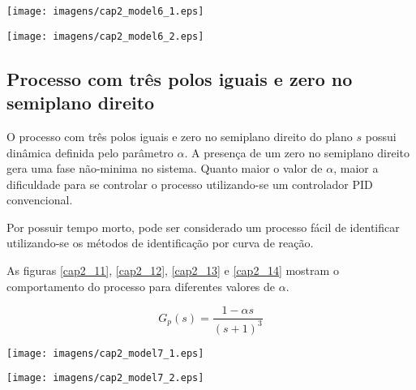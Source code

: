     \begin{center}
        \texttt{[image: imagens/cap2\_model6\_1.eps]}
        \label{cap2_9}
    \end{center}
    
    \begin{center}
        \texttt{[image: imagens/cap2\_model6\_2.eps]}
        \label{cap2_10}
    \end{center}

\subsection{Processo com três polos iguais e zero no semiplano direito}

    O processo com três polos iguais e zero no semiplano direito do plano $s$
    possui dinâmica definida pelo parâmetro $\alpha$. A presença de um
    zero no semiplano direito gera uma fase não-minima no sistema. Quanto maior
    o valor de $\alpha$, maior a dificuldade para se controlar o processo
    utilizando-se um controlador \acs{PID} convencional.
    
    Por possuir tempo morto, pode ser considerado um processo fácil de identificar
    utilizando-se os métodos de identificação por curva de reação.
    
    As figuras \ref{cap2_11}, \ref{cap2_12}, \ref{cap2_13} e \ref{cap2_14}
    mostram o comportamento do processo para diferentes valores de $\alpha$.

    \begin{equation}
        G_p(s) = \frac{1-\alpha s}{(s+1)^3}
    \end{equation}

    \begin{center}
        \texttt{[image: imagens/cap2\_model7\_1.eps]}
        \label{cap2_11}
    \end{center}

    \begin{center}
        \texttt{[image: imagens/cap2\_model7\_2.eps]}
        \label{cap2_12}
    \end{center}
    
